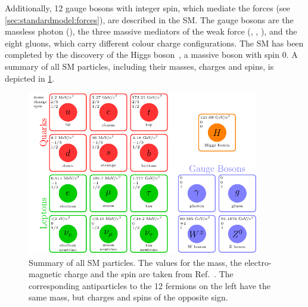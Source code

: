 Additionally, 12 gauge bosons with integer spin, which mediate the forces (see
\cref{sec:standardmodel:forces}), are described in the SM. The gauge bosons
are the massless photon (\g), the three massive mediators of the weak force
(\Wp, \Wm, \Z), and the eight gluons, which carry different colour charge
configurations. The SM has been completed by the discovery of the Higgs
boson~\cite{Higgs-Atlas,Higgs-CMS}, a massive boson with spin 0. A summary of
all SM particles, including their masses, charges and spins, is depicted in
\cref{fig:standardmodel:particles}.
\begin{figure}
\centering
\includegraphics[width=0.9\textwidth]{02-StandardModel/tikz/pdf/SM.pdf}
\caption{Summary of all SM particles. The values for the mass, the
electro-magnetic charge and the spin are taken from Ref.~\cite{PDG2016}. The
corresponding antiparticles to the 12 fermions on the left have the same
mass, but charges and spins of the opposite sign.}
\label{fig:standardmodel:particles}
\end{figure}
